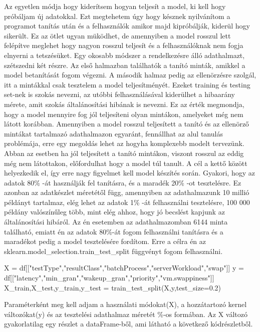 Az egyetlen módja hogy kiderítsem hogyan teljesít a model, ki kell hogy próbáljam új adatokkal. 
Ezt megtehetem úgy hogy késznek nyilvánítom a programot tanítás után és a felhasználók amikor majd kipróbálják, kiderül hogy sikerült. Ez az ötlet ugyan müködhet, de amennyiben a model rosszul lett felépítve meglehet hogy nagyon rosszul teljesít és a felhasználóknak nem fogja elnyerni a tetszésüket. Egy okosabb módszer a rendelkezésre álló adathalmazt, szétszedni két részre. Az első halmazban találhatók a tanító minták, amikkel a model betanítását fogom végezni. A második halmaz pedig az ellenörzésre szolgál, itt a mintákkal csak tesztelem a model teljesítményét.
Ezeket training és testing set-nek is szokás nevezni, az utóbbi felhasználásával kiderülhet a hibaarány mérete, amit szokás általánosítási hibának is nevezni. Ez az érték megmondja, hogy a model mennyire fog jól teljesíteni olyan mintákon, amelyeket még nem látott korábban.
Amennyiben a model rosszul teljesített a tanító és az ellenörző mintákat tartalmazó adathalmazon egyaránt, fennállhat az alul tanulás problémája, erre egy megoldás lehet az hogyha komplexebb modelt tervezünk. Abban az esetben ha jól teljesített a tanító mintákon, viszont rosszul az eddig még nem látottakon, előfordulhat hogy a model túl tanult. A cél a kettő között helyezkedik el, így erre nagy figyelmet kell model készítés során.
Gyakori, hogy az adatok 80\% -át használják fel tanításra, és a maradék 20\% -ot tesztelésre. Ez azonban az adatkészlet méretétől függ, amennyiben az adathalmazunk 10 millió példányt tartalmaz, elég lehet az adatok 1\% -át felhasználni tesztelésre, 100 000 példány valószínűleg több, mint
elég ahhoz, hogy jó becslést kapjunk az általánosítási hibáról. Az én esetemben az adathalmazomban 6144 minta található, emiatt én az adatok 80\%-át fogom felhasználni tanításra és a maradékot pedig a model tesztelésére fordítom. Erre a célra én az sklearn.model\_selection.train\_test\_split függvényt fogom felhasználni. 

\begin{python}
X = df[["testType","resultClass","batchProcess","serverWorkload","swap"]]
y = df[["latency","min_gran","wakeup_gran","priority","vm.swappiness"]]
X_train,X_test,y_train,y_test = train_test_split(X,y,test_size=0.2)
\end{python}

Paraméterként meg kell adjam a használati módokat(X), a hozzátartozó kernel változókat(y) és az tesztelési adathalmaz méretét \%-os formában.
Az X változó gyakorlatilag egy részlet a dataFrame-ből, ami látható a következő kódrészletből.

